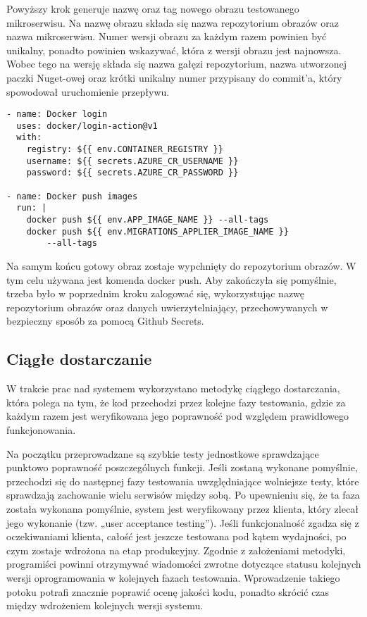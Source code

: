 Powyższy krok generuje nazwę oraz tag nowego obrazu testowanego mikroserwisu. Na nazwę 
obrazu składa się nazwa repozytorium obrazów oraz nazwa mikroserwisu. Numer wersji 
obrazu za każdym razem powinien być unikalny, ponadto powinien wskazywać, która z 
wersji obrazu jest najnowsza. Wobec tego na wersję składa się nazwa gałęzi 
repozytorium, nazwa utworzonej paczki Nuget-owej oraz krótki unikalny numer przypisany 
do commit'a, który spowodował uruchomienie przepływu.

\begin{lstlisting}
- name: Docker login
  uses: docker/login-action@v1
  with:
    registry: ${{ env.CONTAINER_REGISTRY }}
    username: ${{ secrets.AZURE_CR_USERNAME }}
    password: ${{ secrets.AZURE_CR_PASSWORD }}

- name: Docker push images
  run: |
    docker push ${{ env.APP_IMAGE_NAME }} --all-tags
    docker push ${{ env.MIGRATIONS_APPLIER_IMAGE_NAME }} 
        --all-tags
\end{lstlisting}

Na samym końcu gotowy obraz zostaje wypchnięty do repozytorium obrazów. W tym celu 
używana jest komenda docker push. Aby zakończyła się pomyślnie, trzeba było 
w poprzednim kroku zalogować się, wykorzystując nazwę repozytorium obrazów oraz 
danych uwierzytelniający, przechowywanych w bezpieczny sposób za pomocą Github 
Secrets.

\subsection{Ciągłe dostarczanie}

W trakcie prac nad systemem wykorzystano metodykę ciągłego dostarczania, która polega na tym, że kod 
przechodzi przez kolejne fazy testowania, gdzie za każdym razem jest weryfikowana jego poprawność pod 
względem prawidłowego funkcjonowania. 

Na początku przeprowadzane są szybkie testy jednostkowe sprawdzające punktowo poprawność 
poszczególnych funkcji. Jeśli zostaną wykonane pomyślnie, przechodzi się do następnej fazy 
testowania uwzględniające wolniejsze testy, które sprawdzają zachowanie wielu serwisów między 
sobą. Po upewnieniu się, że ta faza została wykonana pomyślnie, system jest weryfikowany przez 
klienta, który zlecał jego wykonanie (tzw. „user acceptance testing”). Jeśli funkcjonalność zgadza się z 
oczekiwaniami klienta, całość jest jeszcze testowana pod kątem wydajności, po czym zostaje 
wdrożona na etap produkcyjny.
Zgodnie z założeniami metodyki, programiści powinni otrzymywać
wiadomości zwrotne dotyczące statusu kolejnych wersji 
oprogramowania w kolejnych fazach testowania. Wprowadzenie takiego potoku potrafi znacznie
poprawić ocenę jakości kodu, ponadto skrócić czas między wdrożeniem kolejnych wersji systemu.

